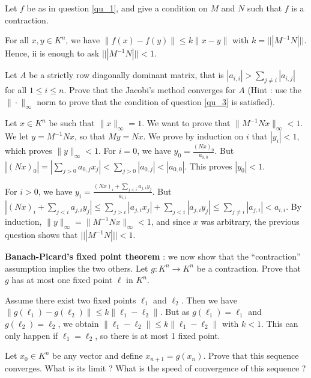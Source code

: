 \documentclass[11pt]{exam}
\theoremstyle{definition}
\begin{document}
{\begin{questions}
	\question
	\label{qu_3}
	Let $f$ be as in question \ref{qu_1}, and give a condition on $M$ and $N$ such that $f$ is a contraction.
	
	\begin{solution}
		For all $x,y \in K^n$, we have $\|f(x)-f(y)\| \leq k \|x-y\|$ with $k = ||| M^{-1}N|||$. Hence, ii is enough to ask $|||M^{-1}N||| < 1$.
	\end{solution}
	
	\question Let $A$ be a strictly row diagonally dominant matrix, that is $|a_{i,i}| > \sum_{j \neq i} |a_{i,j}|$ for all $1 \leq i \leq n$. Prove that the Jacobi's method converges for $A$ (Hint : use the $\| \cdot \|_\infty$ norm to prove that the condition of question \ref{qu_3} is satisfied).
	
	\begin{solution}
		Let $x \in K^n$ be such that $\| x \|_\infty = 1$. We want to prove that $\| M^{-1}Nx \|_\infty < 1$. We let $y=M^{-1}Nx$, so that $My = Nx$. We prove by induction on $i$ that $|y_i| < 1$, which proves $\| y \|_\infty < 1$. For $i = 0$, we have $y_0 = \frac{(Nx)_0}{a_{0,0}}$. But $|(Nx)_0| = |\sum_{j > 0} a_{0,j}x_j| < \sum_{j > 0} |a_{0,j}| < |a_{0,0}|$. This proves $|y_0| < 1$.
		
		For $i > 0$, we have $y_i = \frac{(Nx)_i + \sum_{j<i} a_{j,i}y_j}{a_{i,i}}$. But $|(Nx)_i + \sum_{j<i} a_{j,i}y_j| \leq \sum_{j > i} |a_{j,i} x_j| + \sum_{j<i} |a_{j,i}y_j| \leq \sum_{j \neq i} |a_{j,i}| < a_{i,i}$. By induction, $\|y\|_\infty = \| M^{-1}Nx\|_\infty< 1$, and since $x$ was arbitrary, the previous question shows that $|||M^{-1}N||| < 1$.
	\end{solution}

          
	\textbf{Banach-Picard's fixed point theorem} : we now show that the ``contraction'' assumption implies the two others. 
	\question  Let $g: K^n\rightarrow K^n$ be a contraction. Prove that $g$ has at most one fixed point $\ell$ in $K^n$.
        \begin{solution}
          Assume there exist two fixed points $\ell_1$ and $\ell_2$. Then we have $\|g(\ell_1)-g(\ell_2)\| \leq k \|\ell_1-\ell_2\|$. But as $g(\ell_1) = \ell_1$ and $g(\ell_2) = \ell_2$, we obtain $\|\ell_1-\ell_2\|\leq k \|\ell_1-\ell_2\|$ with $k < 1$. This can only happen if $\ell_1=\ell_2$, so there is at most 1 fixed point.
        \end{solution}
	
	\question
	\label{qu_2}
	Let $x_0 \in K^n$ be any vector and define $x_{n+1} = g(x_n)$. Prove that this sequence converges. What is its limit ? What is the speed of convergence of this sequence ?
	

\end{questions}}
\end{document}
